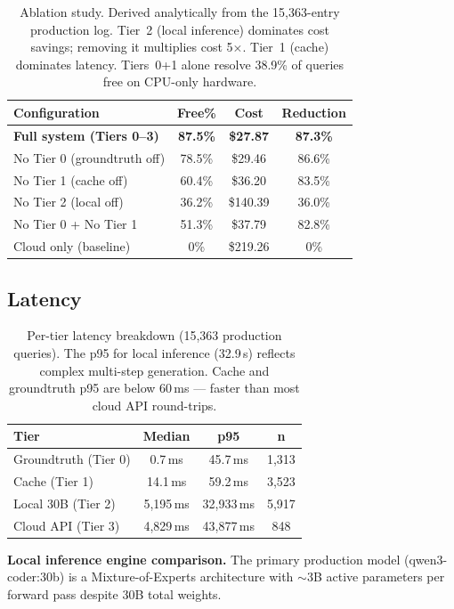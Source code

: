 \documentclass[11pt]{article}
\begin{document}
\begin{table}[t]
\centering
\small
\begin{tabular}{lccc}
\toprule
\textbf{Configuration} & \textbf{Free\%} & \textbf{Cost} & \textbf{Reduction} \\
\midrule
\textbf{Full system (Tiers 0--3)} & \textbf{87.5\%} & \textbf{\$27.87} & \textbf{87.3\%} \\
No Tier 0 (groundtruth off) & 78.5\% & \$29.46 & 86.6\% \\
No Tier 1 (cache off) & 60.4\% & \$36.20 & 83.5\% \\
No Tier 2 (local off) & 36.2\% & \$140.39 & 36.0\% \\
No Tier 0 + No Tier 1 & 51.3\% & \$37.79 & 82.8\% \\
Cloud only (baseline) & 0\% & \$219.26 & 0\% \\
\bottomrule
\end{tabular}
\caption{Ablation study. Derived analytically from the 15,363-entry
production log. Tier~2 (local inference) dominates cost savings;
removing it multiplies cost 5$\times$. Tier~1 (cache) dominates
latency. Tiers~0+1 alone resolve 38.9\% of queries free on CPU-only
hardware.}
\label{tab:ablation}
\end{table}

\subsection{Latency}

\begin{table}[t]
\centering
\small
\begin{tabular}{lccc}
\toprule
\textbf{Tier} & \textbf{Median} & \textbf{p95} & \textbf{n} \\
\midrule
Groundtruth (Tier 0) & 0.7\,ms & 45.7\,ms & 1,313 \\
Cache (Tier 1) & 14.1\,ms & 59.2\,ms & 3,523 \\
Local 30B (Tier 2) & 5,195\,ms & 32,933\,ms & 5,917 \\
Cloud API (Tier 3) & 4,829\,ms & 43,877\,ms & 848 \\
\bottomrule
\end{tabular}
\caption{Per-tier latency breakdown (15,363 production queries). The
p95 for local inference (32.9\,s) reflects complex multi-step
generation. Cache and groundtruth p95 are below 60\,ms --- faster than
most cloud API round-trips.}
\label{tab:latency}
\end{table}

\textbf{Local inference engine comparison.} The primary production
model (qwen3-coder:30b) is a Mixture-of-Experts architecture with
$\sim$3B active parameters per forward pass despite 30B total weights.
\end{document}
